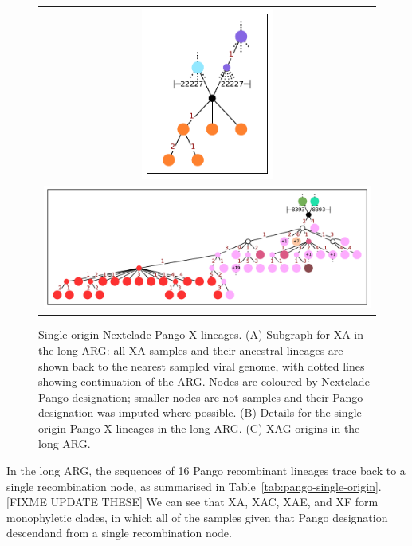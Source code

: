 \documentclass{article}
\begin{document}
\begin{figure}
\begin{tabularx}{\textwidth}{c}


\includegraphics[width=0.4\textwidth]{figures/Pango_XA_nxcld_tight_graph.pdf}
\\ %
\includegraphics[width=\textwidth]{figures/Pango_XAG_nxcld_tight_graph.pdf}
\end{tabularx}
\caption{\label{fig:pango-single-origin-graph}
Single origin Nextclade Pango X lineages. (A) Subgraph for XA in the long ARG: all XA samples and their ancestral lineages are shown back to the nearest sampled viral genome, with dotted lines showing continuation of the ARG. Nodes are coloured by Nextclade Pango designation; smaller nodes are not samples and their Pango designation was imputed where possible. (B) Details for the single-origin Pango X lineages in the long ARG. (C) XAG origins in the long ARG.}
\end{figure}

In the long ARG, the sequences of 16 Pango recombinant lineages trace back to a single recombination node, as summarised in Table~\ref{tab:pango-single-origin}.
[FIXME UPDATE THESE]
We can see that XA, XAC, XAE, and XF form monophyletic clades, in which all of the samples given that Pango designation descendand from a single recombination node.
\end{document}
